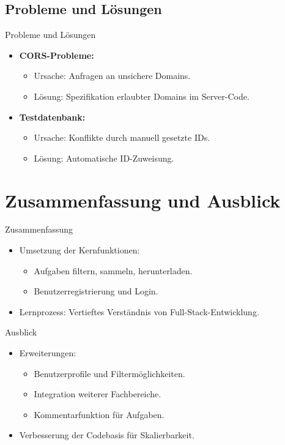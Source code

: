 \documentclass{beamer}
\begin{document}
\subsection{Probleme und Lösungen}
\begin{frame}{Probleme und Lösungen}
    \begin{itemize}
        \item \textbf{CORS-Probleme:}
        \begin{itemize}
            \item Ursache: Anfragen an unsichere Domains.
            \item Lösung: Spezifikation erlaubter Domains im Server-Code.
        \end{itemize}
        \item \textbf{Testdatenbank:}
        \begin{itemize}
            \item Ursache: Konflikte durch manuell gesetzte IDs.
            \item Lösung: Automatische ID-Zuweisung.
        \end{itemize}
    \end{itemize}
\end{frame}

\section{Zusammenfassung und Ausblick}
\begin{frame}{Zusammenfassung}
    \begin{itemize}
        \item Umsetzung der Kernfunktionen:
        \begin{itemize}
            \item Aufgaben filtern, sammeln, herunterladen.
            \item Benutzerregistrierung und Login.
        \end{itemize}
        \item Lernprozess: Vertieftes Verständnis von Full-Stack-Entwicklung.
    \end{itemize}
\end{frame}

\begin{frame}{Ausblick}
    \begin{itemize}
        \item Erweiterungen:
        \begin{itemize}
            \item Benutzerprofile und Filtermöglichkeiten.
            \item Integration weiterer Fachbereiche.
            \item Kommentarfunktion für Aufgaben.
        \end{itemize}
        \item Verbesserung der Codebasis für Skalierbarkeit.
    \end{itemize}
\end{frame}
\end{document}
